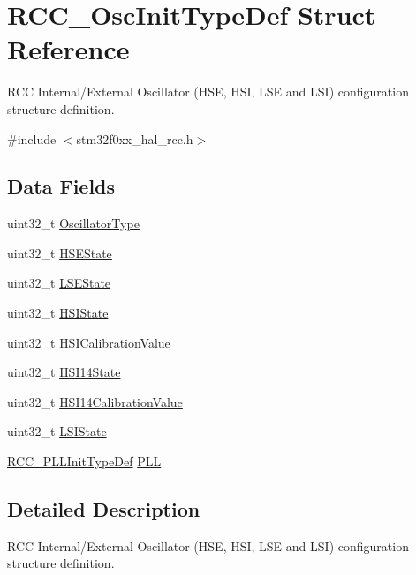 \hypertarget{struct_r_c_c___osc_init_type_def}{}\section{R\+C\+C\+\_\+\+Osc\+Init\+Type\+Def Struct Reference}
\label{struct_r_c_c___osc_init_type_def}


R\+CC Internal/\+External Oscillator (H\+SE, H\+SI, L\+SE and L\+SI) configuration structure definition.  




{\ttfamily \#include $<$stm32f0xx\+\_\+hal\+\_\+rcc.\+h$>$}

\subsection*{Data Fields}
\begin{DoxyCompactItemize}
\item 
uint32\+\_\+t \hyperlink{struct_r_c_c___osc_init_type_def_a23b9d1da2a92936c618d2416406275a3}{Oscillator\+Type}
\item 
uint32\+\_\+t \hyperlink{struct_r_c_c___osc_init_type_def_ad499b1bbeeb8096235b534a9bfa53c9d}{H\+S\+E\+State}
\item 
uint32\+\_\+t \hyperlink{struct_r_c_c___osc_init_type_def_abb72dd5bfb99667e36d99b6887f80a0a}{L\+S\+E\+State}
\item 
uint32\+\_\+t \hyperlink{struct_r_c_c___osc_init_type_def_a49183e0be5cf522de0fa1968df0bf0d7}{H\+S\+I\+State}
\item 
uint32\+\_\+t \hyperlink{struct_r_c_c___osc_init_type_def_ad28b977e258a3ee788cd6c2d72430c30}{H\+S\+I\+Calibration\+Value}
\item 
uint32\+\_\+t \hyperlink{struct_r_c_c___osc_init_type_def_ab73e61c4ac5417939c4ca74cfb0bf0fd}{H\+S\+I14\+State}
\item 
uint32\+\_\+t \hyperlink{struct_r_c_c___osc_init_type_def_aeb6a02415110778760715b50d6106a17}{H\+S\+I14\+Calibration\+Value}
\item 
uint32\+\_\+t \hyperlink{struct_r_c_c___osc_init_type_def_a9acc15f6278f950ef02d5d6f819f68e8}{L\+S\+I\+State}
\item 
\hyperlink{struct_r_c_c___p_l_l_init_type_def}{R\+C\+C\+\_\+\+P\+L\+L\+Init\+Type\+Def} \hyperlink{struct_r_c_c___osc_init_type_def_a7ec4025786fa81e2a4bfc42832c0eddf}{P\+LL}
\end{DoxyCompactItemize}


\subsection{Detailed Description}
R\+CC Internal/\+External Oscillator (H\+SE, H\+SI, L\+SE and L\+SI) configuration structure definition. 

